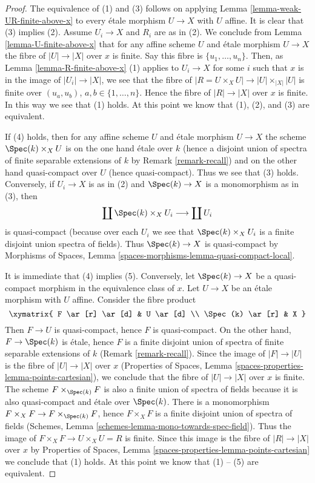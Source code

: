\begin{proof}
The equivalence of (1) and (3) follows on applying
Lemma \ref{lemma-weak-UR-finite-above-x}
to every \'etale morphism $U \to X$ with $U$ affine.
It is clear that (3) implies (2).
Assume $U_i \to X$ and $R_i$ are as in (2). We conclude from
Lemma \ref{lemma-U-finite-above-x}
that for any affine scheme $U$ and \'etale morphism $U \to X$
the fibre of $|U| \to |X|$ over $x$ is finite.
Say this fibre is $\{u_1, \ldots, u_n\}$. Then, as
Lemma \ref{lemma-R-finite-above-x} (1)
applies to $U_i \to X$ for some $i$ such that $x$ is in the image of
$|U_i| \to |X|$, we see that the fibre of
$|R = U \times_X U| \to |U| \times_{|X|} |U|$
is finite over $(u_a, u_b)$, $a, b \in \{1, \ldots, n\}$.
Hence the fibre of $|R| \to |X|$ over $x$ is finite.
In this way we see that (1) holds. At this point we know that
(1), (2), and (3) are equivalent.

\medskip\noindent
If (4) holds, then for any affine scheme $U$ and \'etale morphism
$U \to X$ the scheme $\Spec(k) \times_X U$ is on the one hand
\'etale over $k$ (hence a disjoint union of spectra of finite separable
extensions of $k$ by
Remark \ref{remark-recall})
and on the other hand quasi-compact over $U$ (hence quasi-compact).
Thus we see that (3) holds.
Conversely, if $U_i \to X$ is as in (2) and $\Spec(k) \to X$
is a monomorphism as in (3), then
$$
\coprod \Spec(k) \times_X U_i
\longrightarrow
\coprod U_i
$$
is quasi-compact (because over each $U_i$ we see that
$\Spec(k) \times_X U_i$ is a finite disjoint union spectra of fields).
Thus $\Spec(k) \to X$ is quasi-compact by
Morphisms of Spaces, Lemma \ref{spaces-morphisms-lemma-quasi-compact-local}.

\medskip\noindent
It is immediate that (4) implies (5). Conversely, let $\Spec(k) \to X$
be a quasi-compact morphism in the equivalence class of $x$. Let $U \to X$
be an \'etale morphism with $U$ affine. Consider the fibre product
$$
\xymatrix{
F \ar[r] \ar[d] & U \ar[d] \\
\Spec(k) \ar[r] & X
}
$$
Then $F \to U$ is quasi-compact, hence $F$ is quasi-compact.
On the other hand, $F \to \Spec(k)$ is \'etale, hence $F$ is a
finite disjoint union of spectra of finite separable extensions of $k$
(Remark \ref{remark-recall}). Since the image of $|F| \to |U|$
is the fibre of $|U| \to |X|$ over $x$ (Properties of Spaces, Lemma
\ref{spaces-properties-lemma-points-cartesian}), we conclude that
the fibre of $|U| \to |X|$ over $x$ is finite. The scheme
$F \times_{\Spec(k)} F$ is also a finite union of spectra of fields
because it is also quasi-compact and \'etale over $\Spec(k)$.
There is a monomorphism
$F \times_X F \to F \times_{\Spec(k)} F$, hence $F \times_X F$ is
a finite disjoint union of spectra of fields
(Schemes, Lemma \ref{schemes-lemma-mono-towards-spec-field}).
Thus the image of $F \times_X F \to U \times_X U = R$ is finite.
Since this image is the fibre of $|R| \to |X|$ over $x$ by
Properties of Spaces, Lemma \ref{spaces-properties-lemma-points-cartesian}
we conclude that (1) holds. At this point we know that
(1) -- (5) are equivalent.


\end{proof}
